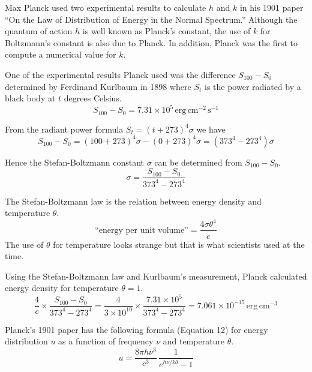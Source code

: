 \documentclass[12pt]{article}
\begin{document}
\noindent
Max Planck used two experimental results to calculate $h$ and $k$ in his 1901 paper
``On the Law of Distribution of Energy in the Normal Spectrum.''
Although the quantum of action $h$ is well known as Planck's constant,
the use of $k$ for Boltzmann's constant is also due to Planck.
In addition, Planck was the first to compute a numerical value for $k$.

\bigskip
\noindent
One of the experimental results Planck used was the difference $S_{100}-S_0$
determined by Ferdinand Kurlbaum in 1898 where
$S_t$ is the power radiated by a black body at $t$ degrees Celsius.
\begin{equation*}
S_{100}-S_0=7.31\times10^5\,\text{erg}\,\text{cm}^{-2}\,\text{s}^{-1}
\end{equation*}

\noindent
From the radiant power formula $S_t=(t+273)^4\sigma$ we have
\begin{equation*}
S_{100}-S_0=(100+273)^4\sigma-(0+273)^4\sigma=(373^4-273^4)\sigma
\end{equation*}

\noindent
Hence the Stefan-Boltzmann constant $\sigma$ can be determined from $S_{100}-S_0$.
\begin{equation*}
\sigma=\frac{S_{100}-S_0}{373^4-273^4}%
\end{equation*}

\noindent
The Stefan-Boltzmann law is the relation between energy density and temperature $\theta$.
\begin{equation*}
\text{``energy per unit volume''}=\frac{4\sigma \theta^4}{c}
\end{equation*}
The use of $\theta$ for temperature looks strange but that is what scientists used at the time.

\bigskip
\noindent
Using the Stefan-Boltzmann law and Kurlbaum's measurement,
Planck calculated energy density for temperature $\theta=1$.
\begin{equation*}
\frac{4}{c}\times
\frac{S_{100}-S_0}{373^4-273^4}
=\frac{4}{3\times10^{10}}\times\frac{7.31\times10^5}{373^4-273^4}
=7.061\times10^{-15}\,\text{erg}\,\text{cm}^{-3}
\end{equation*}

\noindent
Planck's 1901 paper has the following formula (Equation 12) for energy distribution
$u$ as a function of frequency $\nu$ and temperature $\theta$.
\begin{equation*}
u=\frac{8\pi h\nu^3}{c^3}\,\frac{1}{e^{h\nu/k\theta}-1}
\end{equation*}
\end{document}
